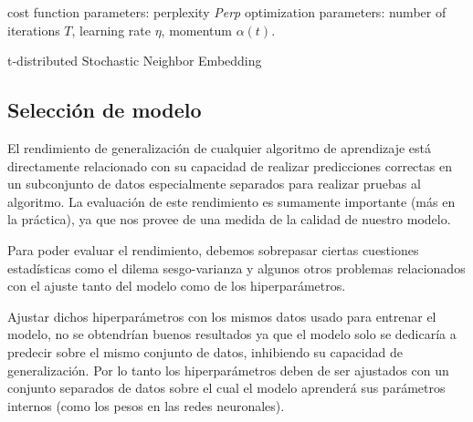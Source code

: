 \begin{algorithm}[H]
    \SetAlgoLined
    \BlankLine
    cost function parameters: perplexity \emph{Perp}
    \BlankLine
    optimization parameters: number of iterations $T$, learning rate $\eta$, momentum $\alpha(t)$.
    \BlankLine
    \BlankLine
    
    \caption{t-distributed Stochastic Neighbor Embedding}\label{alg:tsne}
    \end{algorithm}

\subsection{Selección de modelo}

El rendimiento de generalización de cualquier algoritmo de aprendizaje está
directamente relacionado con su capacidad de realizar predicciones correctas en
un subconjunto de datos especialmente separados para realizar pruebas al
algoritmo. La evaluación de este rendimiento es sumamente importante (más en la
práctica), ya que nos provee de una medida de la calidad de nuestro modelo. 

Para poder evaluar el rendimiento, debemos sobrepasar ciertas cuestiones
estadísticas como el dilema sesgo-varianza y algunos otros problemas
relacionados con el ajuste tanto del modelo como de los hiperparámetros.

Ajustar dichos hiperparámetros con los mismos datos usado para entrenar el
modelo, no se obtendrían buenos resultados ya que el modelo solo se dedicaría a
predecir sobre el mismo conjunto de datos, inhibiendo su capacidad de
generalización. Por lo tanto los hiperparámetros deben de ser ajustados con un
conjunto separados de datos sobre el cual el modelo aprenderá sus parámetros
internos (como los pesos en las redes neuronales). 

